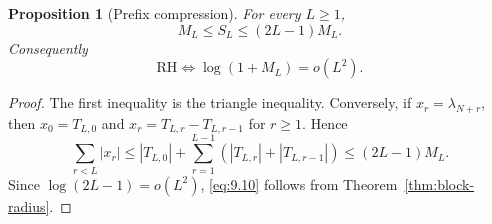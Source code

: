 \documentclass[11pt]{amsart}
\numberwithin{equation}{section}
\newtheorem{proposition}[theorem]{Proposition}
\theoremstyle{definition}
\theoremstyle{remark}
\newcommand{\RH}{\mathrm{RH}}
\begin{document}
\begin{proposition}[Prefix compression]
\label{prop:prefix-compression}
For every \(L\ge1\),
\begin{equation}
 \boxed{M_L\le S_L\le(2L-1)M_L.}                       \label{eq:9.9}
\end{equation}
Consequently
\begin{equation}
 \boxed{\RH\Longleftrightarrow\log(1+M_L)=o(L^2).}     \label{eq:9.10}
\end{equation}
\end{proposition}

\begin{proof}
The first inequality is the triangle inequality. Conversely, if
\(x_r=\lambda_{N+r}\), then \(x_0=T_{L,0}\) and
\(x_r=T_{L,r}-T_{L,r-1}\) for \(r\ge1\). Hence
\[
 \sum_{r<L}|x_r|
 \le |T_{L,0}|+\sum_{r=1}^{L-1}
 (|T_{L,r}|+|T_{L,r-1}|)
 \le(2L-1)M_L.
\]
Since \(\log(2L-1)=o(L^2)\), \eqref{eq:9.10} follows from
Theorem~\ref{thm:block-radius}.
\end{proof}
\end{document}
